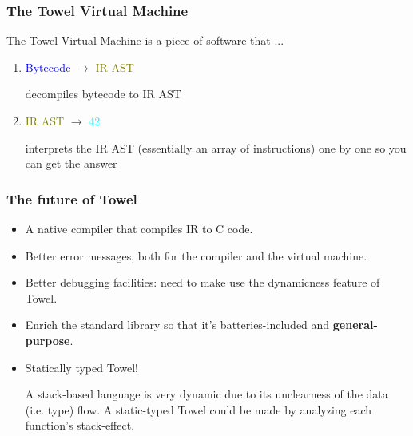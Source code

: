 \documentclass[10pt, compress, handout]{beamer}
\begin{document}
\begin{frame}[fragile]
  \frametitle{The Towel Virtual Machine}

  The Towel Virtual Machine is a piece of software that ...
  \begin{enumerate}[<+->]
  \item \textcolor{blue}{Bytecode} $\rightarrow$ \textcolor{olive}{IR AST}

     decompiles bytecode to IR AST

   \item \textcolor{olive}{IR AST} $\rightarrow$ \textcolor{cyan}{42}

     interprets the IR AST (essentially an array of instructions) one by one so you can get the answer
  \end{enumerate}

\end{frame}

\begin{frame}
  \frametitle{The future of Towel}

  \begin{itemize}
  \item A native compiler that compiles IR to C code.

  \item Better error messages, both for the compiler and the virtual machine.

  \item Better debugging facilities: need to make use the dynamicness feature of Towel.

  \item Enrich the standard library so that it's batteries-included and \textbf{general-purpose}.

  \item Statically typed Towel!

    A stack-based language is very dynamic due to its unclearness of the data (i.e. type) flow. A static-typed Towel could be made by analyzing each function's stack-effect.
  \end{itemize}
\end{frame}
\end{document}
